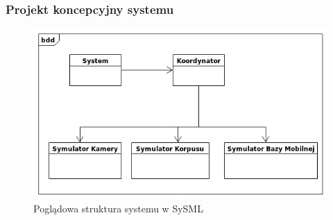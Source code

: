 
\begin{frame}
	\frametitle{Projekt koncepcyjny systemu}
	\bigskip
	\begin{figure}
        \includegraphics[scale=0.40]{./images/example_bdd.png}
        \caption{Poglądowa struktura systemu w SySML}
    \end{figure}
\end{frame}

